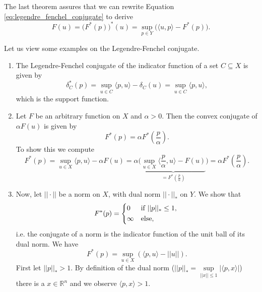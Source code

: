     The last theorem assures that we can rewrite Equation \ref{eq:legendre_fenchel_conjugate} to derive
        $$
            F(u) = \big( F^{\ast}(p) \big)^{\ast}(u) = \sup_{p \in Y} \big( \langle u, p \rangle - F^{\ast}(p) \big).
        $$
    \begin{example}
    \label{ex:legendre_fenchel_conjugate_example}

        Let us view some examples on the Legendre-Fenchel conjugate.
        \begin{enumerate}
            \item The Legendre-Fenchel conjugate of the indicator function of a set $C \subseteq X$ is given by
                $$
                    \delta^{\ast}_{C}(p) = \sup_{u \in C} \langle p, u \rangle - \delta_{C}(u) = \sup_{u \in C} \langle p, u \rangle,
                $$
            which is the support function.
            \item Let $F$ be an arbitrary function on $X$ and $\alpha > 0$. Then the convex conjugate of $\alpha F(u)$ is given by
                $$
                    F^{\ast}(p) = \alpha F^{\ast}(\frac{p}{\alpha}).
                $$
            To show this we compute
                $$
                    F^{\ast}(p) = \sup_{u \in X} \langle p, u \rangle - \alpha F(u) = \alpha \big( \underbrace{\sup_{u \in X} \langle \frac{p}{\alpha}, u \rangle - F(u)}_{= F^{\ast}(\frac{p}{\alpha})} \big) = \alpha F^{\ast}(\frac{p}{\alpha}).
                $$
            \item Now, let $||\cdot||$ be a norm on $X$, with dual norm $||\cdot||_{\ast}$ on $Y$. We show that
                $$
                    F^{\ast}(p) =
                        \begin{dcases*}
                            0 & \textnormal{if $||p||_{\ast} \le 1$,} \\
                            \infty & \textnormal{else},
                        \end{dcases*}
                $$
            i.e. the conjugate of a norm is the indicator function of the unit ball of its dual norm. We have
                $$
                    F^{\ast}(p) = \sup_{u \in X} (\langle p, u \rangle - ||u||).
                $$
            First let $||p||_{\ast} > 1$. By definition of the dual norm ($||p||_{\ast} = \sup\limits_{||x|| \le 1} |\langle p, x \rangle|$) there is a $x \in \mathbb{R}^{n}$ and we observe $\langle p, x \rangle > 1$.


\end{enumerate}
\end{example}
